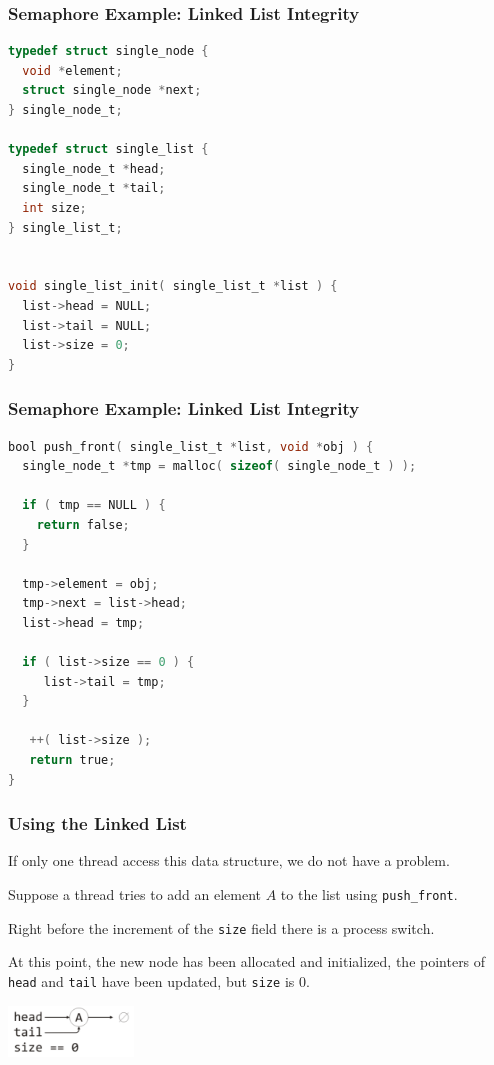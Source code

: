\begin{frame}[fragile]
\frametitle{Semaphore Example: Linked List Integrity}

\begin{lstlisting}[language=C]
typedef struct single_node {
  void *element;
  struct single_node *next;
} single_node_t;

typedef struct single_list {
  single_node_t *head;
  single_node_t *tail;
  int size;
} single_list_t;


void single_list_init( single_list_t *list ) {
  list->head = NULL;
  list->tail = NULL;
  list->size = 0;
}
\end{lstlisting}
\end{frame}

\begin{frame}[fragile]
\frametitle{Semaphore Example: Linked List Integrity}

\begin{lstlisting}[language=C]
bool push_front( single_list_t *list, void *obj ) {
  single_node_t *tmp = malloc( sizeof( single_node_t ) );
  
  if ( tmp == NULL ) {
    return false;
  }
  
  tmp->element = obj;
  tmp->next = list->head;
  list->head = tmp;

  if ( list->size == 0 ) {
     list->tail = tmp;
  }
  
   ++( list->size );
   return true;
}

\end{lstlisting}
\end{frame}


\begin{frame}
\frametitle{Using the Linked List}

If only one thread access this data structure, we do not have a problem.

Suppose a thread tries to add an element $A$ to the list using \texttt{push\_front}. 

Right before the increment of the \texttt{size} field there is a process switch. 

At this point, the new node has been allocated and initialized, the pointers of \texttt{head} and \texttt{tail} have been updated, but \texttt{size} is 0. 

\begin{center}
\includegraphics[width=0.25\textwidth]{images/linkedlist1.png}
\end{center}

\end{frame}

